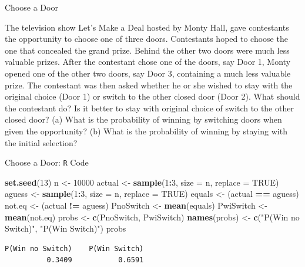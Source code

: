 \documentclass[
  ignorenonframetext,
]{beamer}
\newenvironment{Shaded}{\begin{snugshade}}{\end{snugshade}}
\newcommand{\AttributeTok}[1]{\textcolor[rgb]{0.13,0.29,0.53}{#1}}
\newcommand{\ConstantTok}[1]{\textcolor[rgb]{0.56,0.35,0.01}{#1}}
\newcommand{\DecValTok}[1]{\textcolor[rgb]{0.00,0.00,0.81}{#1}}
\newcommand{\FunctionTok}[1]{\textcolor[rgb]{0.13,0.29,0.53}{\textbf{#1}}}
\newcommand{\NormalTok}[1]{#1}
\newcommand{\OtherTok}[1]{\textcolor[rgb]{0.56,0.35,0.01}{#1}}
\newcommand{\SpecialCharTok}[1]{\textcolor[rgb]{0.81,0.36,0.00}{\textbf{#1}}}
\newcommand{\StringTok}[1]{\textcolor[rgb]{0.31,0.60,0.02}{#1}}
\begin{document}
\begin{frame}{Choose a Door}
\label{choose-a-door}
\begin{tcolorbox}
The television show Let's Make a Deal hosted by Monty Hall, gave contestants the opportunity to choose one of three doors. Contestants hoped to choose the one that concealed the grand prize. Behind the other two doors were much less valuable prizes. After the contestant chose one of the doors, say Door 1, Monty opened one of the other two doors, say Door 3, containing a much less valuable prize. The contestant was then asked whether he or she wished to stay with the original choice (Door 1) or switch to the other closed door (Door 2). What should the contestant do? Is it better to stay with original choice of switch to the other closed door? (a) What is the probability of winning by switching doors when given the opportunity? (b) What is the probability of winning by staying with the initial selection?


\end{tcolorbox}
\end{frame}

\begin{frame}[fragile]{Choose a Door: \texttt{R} Code}
\label{choose-a-door-r-code}
\small

\begin{Shaded}
\begin{Highlighting}[]
\FunctionTok{set.seed}\NormalTok{(}\DecValTok{13}\NormalTok{)}
\NormalTok{n }\OtherTok{\textless{}{-}} \DecValTok{10000}
\NormalTok{actual }\OtherTok{\textless{}{-}} \FunctionTok{sample}\NormalTok{(}\DecValTok{1}\SpecialCharTok{:}\DecValTok{3}\NormalTok{, }\AttributeTok{size =}\NormalTok{ n, }\AttributeTok{replace =} \ConstantTok{TRUE}\NormalTok{)}
\NormalTok{aguess }\OtherTok{\textless{}{-}} \FunctionTok{sample}\NormalTok{(}\DecValTok{1}\SpecialCharTok{:}\DecValTok{3}\NormalTok{, }\AttributeTok{size =}\NormalTok{ n, }\AttributeTok{replace =} \ConstantTok{TRUE}\NormalTok{)}
\NormalTok{equals }\OtherTok{\textless{}{-}}\NormalTok{ (actual }\SpecialCharTok{==}\NormalTok{ aguess)}
\NormalTok{not.eq }\OtherTok{\textless{}{-}}\NormalTok{ (actual }\SpecialCharTok{!=}\NormalTok{ aguess)}
\NormalTok{PnoSwitch }\OtherTok{\textless{}{-}} \FunctionTok{mean}\NormalTok{(equals)}
\NormalTok{PwiSwitch }\OtherTok{\textless{}{-}} \FunctionTok{mean}\NormalTok{(not.eq)}
\NormalTok{probs }\OtherTok{\textless{}{-}} \FunctionTok{c}\NormalTok{(PnoSwitch, PwiSwitch)}
\FunctionTok{names}\NormalTok{(probs) }\OtherTok{\textless{}{-}} \FunctionTok{c}\NormalTok{(}\StringTok{"P(Win no Switch)"}\NormalTok{, }\StringTok{"P(Win Switch)"}\NormalTok{)}
\NormalTok{probs}
\end{Highlighting}
\end{Shaded}

\begin{verbatim}
P(Win no Switch)    P(Win Switch) 
          0.3409           0.6591 
\end{verbatim}

\normalsize
\end{frame}
\end{document}
